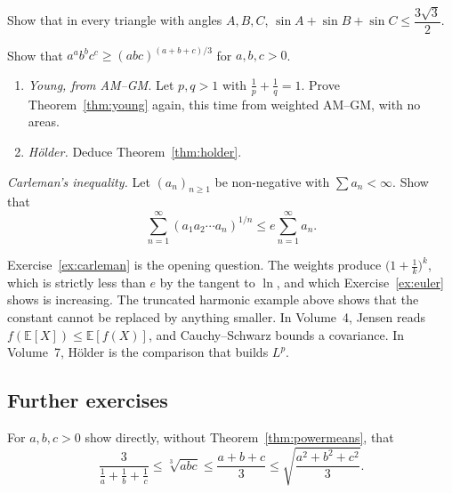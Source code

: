 \begin{exercise}[$\star\star$]\label{ex:triangle}
Show that in every triangle with angles $A,B,C$, $\sin A+\sin B+\sin C\le\dfrac{3\sqrt3}2$.
\end{exercise}

\begin{exercise}[$\star\star$]\label{ex:aabbcc}
Show that $a^ab^bc^c\ge(abc)^{(a+b+c)/3}$ for $a,b,c>0$.
\end{exercise}

\begin{exercise}[$\star\star$]\label{ex:holder}
\begin{enumerate}[label=(\alph*)]
\item \emph{Young, from AM--GM.} Let $p,q>1$ with $\frac1p+\frac1q=1$. Prove Theorem~\ref{thm:young} again, this time from weighted AM--GM, with no areas.
\item \emph{H\"older.} Deduce Theorem~\ref{thm:holder}.
\end{enumerate}
\end{exercise}

\begin{exercise}[$\star\star\star$]\label{ex:carleman}
\emph{Carleman's inequality.} Let $(a_n)_{n\ge1}$ be non-negative with $\sum a_n<\infty$. Show that
\[
\sum_{n=1}^\infty\left(a_1a_2\cdots a_n\right)^{1/n}\le e\sum_{n=1}^\infty a_n.
\]
\end{exercise}

\begin{beauty}
Exercise~\ref{ex:carleman} is the opening question. The weights produce $\bigl(1+\frac1k\bigr)^k$, which is strictly less than $e$ by the tangent to $\ln$, and which Exercise~\ref{ex:euler} shows is increasing. The truncated harmonic example above shows that the constant cannot be replaced by anything smaller. In Volume~4, Jensen reads $f(\mathbb E[X])\le\mathbb E[f(X)]$, and Cauchy--Schwarz bounds a covariance. In Volume~7, H\"older is the comparison that builds $L^p$.
\end{beauty}

\subsection*{Further exercises}

\begin{exercise}[$\star$]\label{ex:means3}
For $a,b,c>0$ show directly, without Theorem~\ref{thm:powermeans}, that
\[
\frac3{\frac1a+\frac1b+\frac1c}\le\sqrt[3]{abc}\le\frac{a+b+c}3\le\sqrt{\frac{a^2+b^2+c^2}3}.
\]
\end{exercise}

